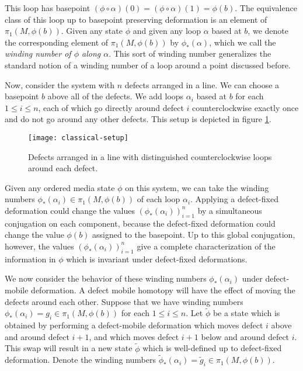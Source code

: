 This loop has basepoint $(\phi \circ \alpha)(0)=(\phi\circ \alpha)(1)=\phi(b)$. The equivalence class of this loop up to basepoint preserving deformation is an element of $\pi_1(M,\phi(b))$. Given any state $\phi$ and given any loop $\alpha$ based at $b$, we denote the corresponding element of $\pi_1(M,\phi(b))$ by $\phi_*(\alpha)$, which we call the \textit{winding number of $\phi$ along $\alpha$}. This sort of winding number generalizes the standard notion of a winding number of a loop around a point discussed before.

Now, consider the system with $n$ defects arranged in a line. We can choose a basepoint $b$ above all of the defects. We add loops $\alpha_i$ based at $b$ for each $1\leq i \leq n$, each of which go directly around defect $i$ counterclockwise exactly once and do not go around any other defects. This setup is depicted in figure \ref{classical-setup}.

\begin{figure}
\begin{center}
\texttt{[image: classical-setup]}
\caption{Defects arranged in a line with distinguished counterclockwise loops around each defect.}
\label{classical-setup}
\end{center}
\end{figure}

Given any ordered media state $\phi$ on this system, we can take the winding numbers $\phi_*(\alpha_i)\in \pi_1(M,\phi(b))$ of each loop $\alpha_i$. Applying a defect-fixed deformation could change the values $(\phi_*(\alpha_i))_{i=1}^n$ by a simultaneous conjugation on each component, because the defect-fixed deformation could change the value $\phi(b)$ assigned to the basepoint. Up to this global conjugation, however, the values $(\phi_*(\alpha_i))_{i=1}^n$ give a complete characterization of the information in $\phi$ which is invariant under defect-fixed deformations.

We now consider the behavior of these winding numbers $\phi_*(\alpha_i)$ under defect-mobile deformation. A defect mobile homotopy will have the effect of moving the defects around each other. Suppose that we have winding numbers $\phi_*(\alpha_i)=g_i\in \pi_1(M,\phi(b))$ for each $1\leq i\leq n$. Let $\tilde{\phi}$ be a state which is obtained by performing a defect-mobile deformation which moves defect $i$ above and around defect $i+1$, and which moves defect $i+1$ below and around defect $i$. This swap will result in a new state $\tilde{\phi}$ which is well-defined up to defect-fixed deformation. Denote the winding numbers $\tilde{\phi}_*(\alpha_i)=\tilde{g}_i\in \pi_1(M,\phi(b))$.

